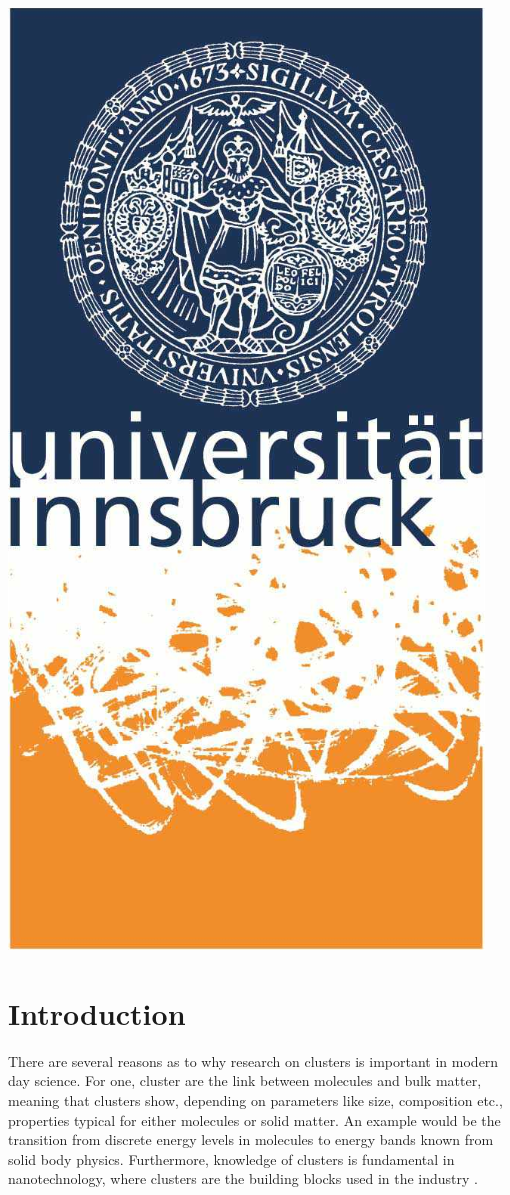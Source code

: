 \documentclass[a4paper,10pt]{article}
\begin{document}
\begin{titlepage}
	\begin{center}
	\includegraphics[scale=0.56]{img/uibk}
	\end{center}

\end{titlepage}


\section{Introduction}
There are several reasons as to why research on clusters is important in modern day science. For one, cluster are the link between molecules and bulk matter, meaning that clusters show, depending on parameters like size, composition etc., properties typical for either molecules or solid matter. An example would be the transition from discrete energy levels in molecules to energy bands known from solid body physics. Furthermore, knowledge of clusters is fundamental in nanotechnology, where clusters are the building blocks used in the industry \cite{script}.
\end{document}
